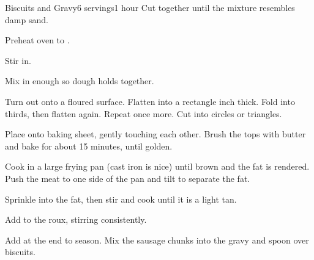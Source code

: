 \documentclass[../Cookbook.tex]{subfiles}
\begin{document}
\begin{recipe}[BiscuitsAndGravy]{Biscuits and Gravy}{6 servings}{1 hour}
Cut together until the mixture resembles damp sand.

Preheat oven to .

Stir in.

Mix in enough so dough holds together.

Turn out onto a floured surface. Flatten into a rectangle  inch thick. Fold into thirds, then flatten again. Repeat once more.
Cut into circles or triangles.

Place onto baking sheet, gently touching each other.
Brush the tops with butter and bake for about 15 minutes, until golden.

Cook in a large frying pan (cast iron is nice) until brown and the fat is rendered.
Push the meat to one side of the pan and tilt to separate the fat.

Sprinkle into the fat, then stir and cook until it is a light tan.

Add to the roux, stirring consistently.

Add at the end to season. Mix the sausage chunks into the gravy and spoon over biscuits.

\end{recipe}
\end{document}
